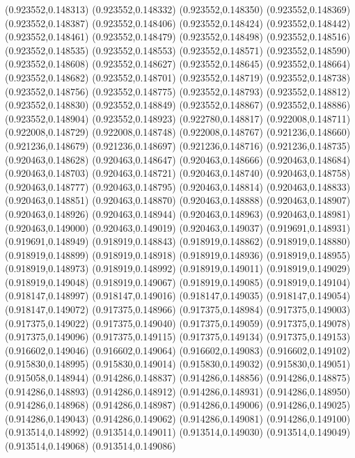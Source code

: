 (0.923552,0.148313)
(0.923552,0.148332)
(0.923552,0.148350)
(0.923552,0.148369)
(0.923552,0.148387)
(0.923552,0.148406)
(0.923552,0.148424)
(0.923552,0.148442)
(0.923552,0.148461)
(0.923552,0.148479)
(0.923552,0.148498)
(0.923552,0.148516)
(0.923552,0.148535)
(0.923552,0.148553)
(0.923552,0.148571)
(0.923552,0.148590)
(0.923552,0.148608)
(0.923552,0.148627)
(0.923552,0.148645)
(0.923552,0.148664)
(0.923552,0.148682)
(0.923552,0.148701)
(0.923552,0.148719)
(0.923552,0.148738)
(0.923552,0.148756)
(0.923552,0.148775)
(0.923552,0.148793)
(0.923552,0.148812)
(0.923552,0.148830)
(0.923552,0.148849)
(0.923552,0.148867)
(0.923552,0.148886)
(0.923552,0.148904)
(0.923552,0.148923)
(0.922780,0.148817)
(0.922008,0.148711)
(0.922008,0.148729)
(0.922008,0.148748)
(0.922008,0.148767)
(0.921236,0.148660)
(0.921236,0.148679)
(0.921236,0.148697)
(0.921236,0.148716)
(0.921236,0.148735)
(0.920463,0.148628)
(0.920463,0.148647)
(0.920463,0.148666)
(0.920463,0.148684)
(0.920463,0.148703)
(0.920463,0.148721)
(0.920463,0.148740)
(0.920463,0.148758)
(0.920463,0.148777)
(0.920463,0.148795)
(0.920463,0.148814)
(0.920463,0.148833)
(0.920463,0.148851)
(0.920463,0.148870)
(0.920463,0.148888)
(0.920463,0.148907)
(0.920463,0.148926)
(0.920463,0.148944)
(0.920463,0.148963)
(0.920463,0.148981)
(0.920463,0.149000)
(0.920463,0.149019)
(0.920463,0.149037)
(0.919691,0.148931)
(0.919691,0.148949)
(0.918919,0.148843)
(0.918919,0.148862)
(0.918919,0.148880)
(0.918919,0.148899)
(0.918919,0.148918)
(0.918919,0.148936)
(0.918919,0.148955)
(0.918919,0.148973)
(0.918919,0.148992)
(0.918919,0.149011)
(0.918919,0.149029)
(0.918919,0.149048)
(0.918919,0.149067)
(0.918919,0.149085)
(0.918919,0.149104)
(0.918147,0.148997)
(0.918147,0.149016)
(0.918147,0.149035)
(0.918147,0.149054)
(0.918147,0.149072)
(0.917375,0.148966)
(0.917375,0.148984)
(0.917375,0.149003)
(0.917375,0.149022)
(0.917375,0.149040)
(0.917375,0.149059)
(0.917375,0.149078)
(0.917375,0.149096)
(0.917375,0.149115)
(0.917375,0.149134)
(0.917375,0.149153)
(0.916602,0.149046)
(0.916602,0.149064)
(0.916602,0.149083)
(0.916602,0.149102)
(0.915830,0.148995)
(0.915830,0.149014)
(0.915830,0.149032)
(0.915830,0.149051)
(0.915058,0.148944)
(0.914286,0.148837)
(0.914286,0.148856)
(0.914286,0.148875)
(0.914286,0.148893)
(0.914286,0.148912)
(0.914286,0.148931)
(0.914286,0.148950)
(0.914286,0.148968)
(0.914286,0.148987)
(0.914286,0.149006)
(0.914286,0.149025)
(0.914286,0.149043)
(0.914286,0.149062)
(0.914286,0.149081)
(0.914286,0.149100)
(0.913514,0.148992)
(0.913514,0.149011)
(0.913514,0.149030)
(0.913514,0.149049)
(0.913514,0.149068)
(0.913514,0.149086)
